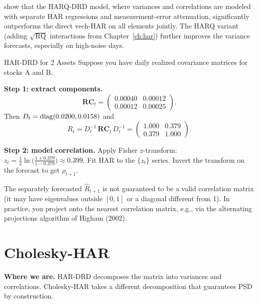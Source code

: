 \begin{keyresult}
\citet{BollerslevPattonQuaedvlieg2018} show that the HARQ-DRD model, where
variances and correlations are modeled with separate HAR regressions and
measurement-error attenuation, significantly outperforms the direct vech-HAR
on all elements jointly. The HARQ variant (adding $\sqrt{\operatorname{RQ}}$
interactions from Chapter~\ref{ch:har}) further improves the variance
forecasts, especially on high-noise days.
\end{keyresult}

\begin{workedexample}{HAR-DRD for 2 Assets}
Suppose you have daily realized covariance matrices for stocks A and B.

\textbf{Step 1: extract components.}
\[
  \mathbf{RC}_t = \begin{pmatrix} 0.00040 & 0.00012 \\ 0.00012 & 0.00025 \end{pmatrix}.
\]
Then $D_t = \operatorname{diag}(0.0200, 0.0158)$ and
\[
  R_t = D_t^{-1}\,\mathbf{RC}_t\, D_t^{-1}
  = \begin{pmatrix} 1.000 & 0.379 \\ 0.379 & 1.000 \end{pmatrix}.
\]

\textbf{Step 2: model correlation.}  Apply Fisher $z$-transform:
$z_t = \frac{1}{2}\ln\!\bigl(\frac{1 + 0.379}{1 - 0.379}\bigr) \approx 0.399$.
Fit HAR to the $\{z_t\}$ series. Invert the transform on the forecast to get
$\hat{\rho}_{t+1}$.
\end{workedexample}

\begin{warning}
The separately forecasted $\hat{R}_{t+1}$ is not guaranteed to be a valid
correlation matrix (it may have eigenvalues outside $[0,1]$ or a diagonal
different from 1). In practice, you project onto the nearest correlation
matrix, e.g., via the alternating projections algorithm of Higham (2002).
\end{warning}


\section{Cholesky-HAR}\label{sec:multivariate:cholesky}

\textbf{Where we are.}  HAR-DRD decomposes the matrix into variances and
correlations. Cholesky-HAR takes a different decomposition that guarantees PSD
by construction.

